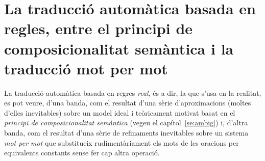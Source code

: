 

\section[La traducció automàtica real entre\ldots]{La traducció
  automàtica basada en regles, entre el principi de composicionalitat
  semàntica i la traducció mot per mot}

La traducció automàtica basada en regres \emph{real}, és a dir, la que
s'usa en la realitat, es pot veure, d'una banda, com el resultat d'una
sèrie d'aproximacions (moltes d'elles inevitables) sobre un model
ideal i teòricament motivat basat en el \emph{principi de
  composicionalitat semàntica} (vegeu el capítol~\ref{se:ambig}) i,
d'altra banda, com el resultat d'una sèrie de refinaments inevitables
sobre un sistema \emph{mot per mot} que substitueix rudimentàriament
els mots de les oracions per equivalents constants sense fer cap altra
operació.

